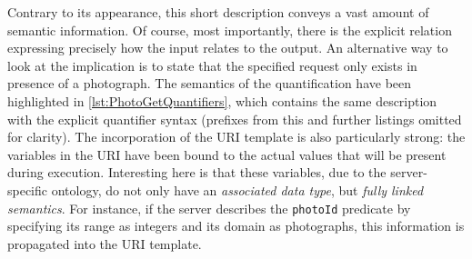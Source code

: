 \documentclass[runningheads,a4paper, twocolumn]{llncs}
\begin{document}
Contrary to its appearance, this short description conveys a vast amount of semantic information. Of course, most importantly, there is the explicit relation expressing precisely how the input relates to the output. An alternative way to look at the implication is to state that the specified request only exists in presence of a photograph. The semantics of the quantification have been highlighted in \autoref{lst:PhotoGetQuantifiers}, which contains the same description with the explicit quantifier syntax (prefixes from this and further listings omitted for clarity). The incorporation of the URI template is also particularly strong: the variables in the URI have been bound to the actual values that will be present during execution. Interesting here is that these variables, due to the server-specific ontology, do not only have an \emph{associated data type}, but \emph{fully linked semantics}. For instance, if the server describes the \Verb!photoId! predicate by specifying its range as integers and its domain as photographs, this information is propagated into the URI template. \label{SemanticTemplateURI}
\end{document}
